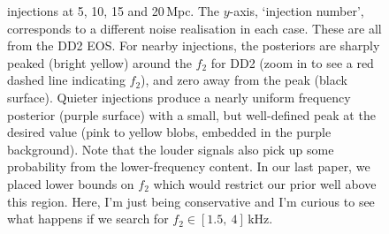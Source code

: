 \documentclass[showpacs, superscriptaddress, showpacs, letterpaper, showkeys,
preprintnumbers, altaffilletter, amssymb, amsmath, amsfonts, prd,
onecolumn, floatfix, nofootinbib]{revtex4-1}
\begin{document}
\begin{figure}
{injections at 5, 10, 15 and 20\,Mpc.  The $y$-axis, `injection number',
corresponds to a different noise realisation in each case.  These are all from
the DD2 EOS.  For nearby injections, the posteriors are sharply peaked (bright
yellow) around the $f_2$ for DD2 (zoom in to see a red dashed line indicating
$f_2$), and zero away from the peak (black surface).  Quieter injections produce
a nearly uniform frequency posterior (purple surface) with a small, but
well-defined peak at the desired value (pink to yellow blobs, embedded in the
purple background).  Note that the louder signals also pick up some probability
from the lower-frequency content.  In our last paper, we placed lower bounds
on $f_2$ which would restrict our prior well above this region.  Here, I'm just
being conservative and I'm curious to see what happens if we search for
$f_2\in[1.5,~4]$\,kHz.\label{fig:freq_pdf_surfs}}
\end{figure}
\end{document}
